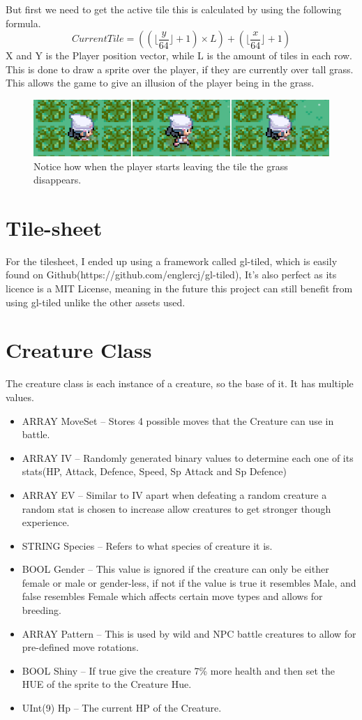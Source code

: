 \documentclass[11pt,a4paper]{article}
\begin{document}
But first we need to get the active tile this is calculated by using the following formula. 
$$CurrentTile =((\lfloor\frac{y}{64}\rfloor + 1)\times L) +(\lfloor\frac{x}{64}\rfloor + 1)$$
X and Y is the Player position vector, while L is the amount of tiles in each row. This is done to draw a sprite over the player, if they are currently over tall grass. This allows the game to give an illusion of the player being in the grass.
\begin{figure}[h]
\caption{Notice how when the player starts leaving the tile the grass disappears.}
\centering
\includegraphics[width=1\textwidth]{grass_walk.png}
\end{figure}

\section{Tile-sheet} 
For the tilesheet, I ended up using a framework called gl-tiled, which is easily found on Github(https://github.com/englercj/gl-tiled), It's also perfect as its licence is a MIT License, meaning in the future this project can still benefit from using gl-tiled unlike the other assets used.

\newpage\section{Creature Class} 
The creature class is each instance of a creature, so the base of it. It has multiple values.

\begin{itemize}
\item ARRAY MoveSet -- Stores 4 possible moves that the Creature can use in battle.
\item ARRAY IV -- Randomly generated binary values to determine each one of its stats(HP, Attack,  Defence, Speed, Sp Attack and Sp Defence)
\item ARRAY EV -- Similar to IV apart when defeating a random creature a random stat is chosen to increase allow creatures to get stronger though experience. 
\item STRING Species -- Refers to what species of creature it is.
\item BOOL Gender -- This value is ignored if the creature can only be either female or male or gender-less, if not if the value is true it resembles Male, and false resembles Female which affects certain move types and allows for breeding. 
\item ARRAY Pattern -- This is used by wild and NPC battle creatures to allow for pre-defined move rotations.
\item BOOL Shiny  -- If true give the creature 7\% more health and then set the HUE of the sprite to the Creature Hue.
\item UInt(9) Hp -- The current HP of the Creature.
\end{itemize}
\end{document}
